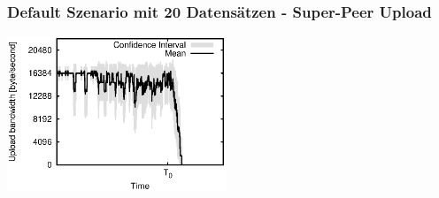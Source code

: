 \begin{frame}
  \frametitle{Default Szenario mit 20 Datensätzen - Super-Peer Upload}
  \begin{center}
    \includegraphics[width=0.49\textwidth]{fig/plots/scenario_6_parts_20/plots/GeneratedMeanCurrentSuperSeederUploadBandwidth.csv.eps}
  \end{center}
\end{frame}



